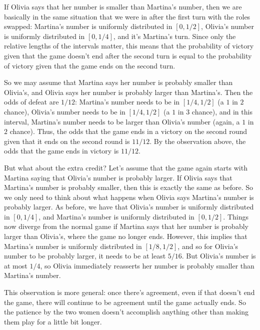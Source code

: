 \documentclass[11pt]{article}
\theoremstyle{definition}
\begin{document}
If Olivia says that her number is smaller than Martina's number, then we are basically in the same situation that we were in after the first turn with the roles swapped: Martina's number is uniformly distributed in $[0, 1/2]$, Olivia's number is uniformly distributed in $[0, 1/4]$, and it's Martina's turn.  Since only the relative lengths of the intervals matter, this means that the probability of victory given that the game doesn't end after the second turn is equal to the probability of victory given that the game ends on the second turn.

So we may assume that Martina says her number is probably smaller than Olivia's, and Olivia says her number is probably larger than Martina's.  Then the odds of defeat are $1/12$: Martina's number needs to be in $[1/4, 1/2]$ (a $1$ in $2$ chance), Olivia's number needs to be in $[1/4, 1/2]$ (a $1$ in $3$ chance), and in this interval, Martina's number needs to be larger than Olivia's number (again, a $1$ in $2$ chance).  Thus, the odds that the game ends in a victory on the second round given that it ends on the second round is $11/12$.  By the observation above, the odds that the game ends in victory is $11/12$.

But what about the extra credit?  Let's assume that the game again starts with Martina saying that Olivia's number is probably larger.  If Olivia says that Martina's number is probably smaller, then this is exactly the same as before.  So we only need to think about what happens when Olivia says Martina's number is probably larger.  As before, we have that Olivia's number is uniformly distributed in $[0, 1/4]$, and Martina's number is uniformly distributed in $[0, 1/2]$.  Things now diverge from the normal game if Martina says that her number is probably larger than Olivia's, where the game no longer ends.  However, this implies that Martina's number is uniformly distributed in $[1/8, 1/2]$, and so for Olivia's number to be probably larger, it needs to be at least $5/16$.  But Olivia's number is at most $1/4$, so Olivia immediately reasserts her number is probably smaller than Martina's number.

This observation is more general: once there's agreement, even if that doesn't end the game, there will continue to be agreement until the game actually ends.  So the patience by the two women doesn't accomplish anything other than making them play for a little bit longer.
\end{document}
